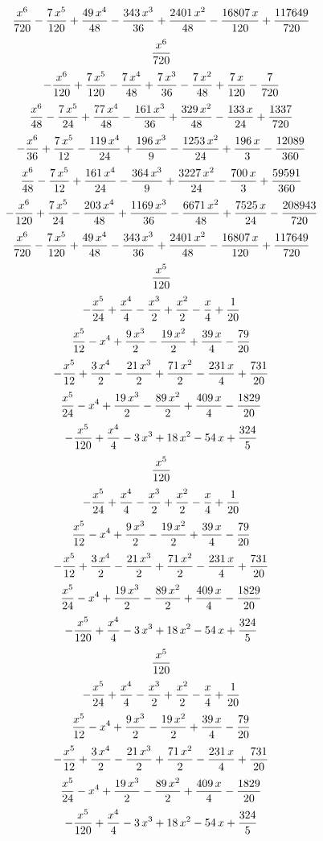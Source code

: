 $${{x^6}\over{720}}-{{7\,x^5}\over{120}}+{{49\,x^4}\over{48}}-{{343\,
 x^3}\over{36}}+{{2401\,x^2}\over{48}}-{{16807\,x}\over{120}}+{{
 117649}\over{720}}$$
$${{x^6}\over{720}}$$
$$-{{x^6}\over{120}}+{{7\,x^5}\over{120}}-{{7\,x^4}\over{48}}+{{7\,x^
 3}\over{36}}-{{7\,x^2}\over{48}}+{{7\,x}\over{120}}-{{7}\over{720}}$$
$${{x^6}\over{48}}-{{7\,x^5}\over{24}}+{{77\,x^4}\over{48}}-{{161\,x^
 3}\over{36}}+{{329\,x^2}\over{48}}-{{133\,x}\over{24}}+{{1337}\over{
 720}}$$
$$-{{x^6}\over{36}}+{{7\,x^5}\over{12}}-{{119\,x^4}\over{24}}+{{196\,
 x^3}\over{9}}-{{1253\,x^2}\over{24}}+{{196\,x}\over{3}}-{{12089
 }\over{360}}$$
$${{x^6}\over{48}}-{{7\,x^5}\over{12}}+{{161\,x^4}\over{24}}-{{364\,x
 ^3}\over{9}}+{{3227\,x^2}\over{24}}-{{700\,x}\over{3}}+{{59591
 }\over{360}}$$
$$-{{x^6}\over{120}}+{{7\,x^5}\over{24}}-{{203\,x^4}\over{48}}+{{1169
 \,x^3}\over{36}}-{{6671\,x^2}\over{48}}+{{7525\,x}\over{24}}-{{
 208943}\over{720}}$$
$${{x^6}\over{720}}-{{7\,x^5}\over{120}}+{{49\,x^4}\over{48}}-{{343\,
 x^3}\over{36}}+{{2401\,x^2}\over{48}}-{{16807\,x}\over{120}}+{{
 117649}\over{720}}$$
$${{x^5}\over{120}}$$
$$-{{x^5}\over{24}}+{{x^4}\over{4}}-{{x^3}\over{2}}+{{x^2}\over{2}}-
 {{x}\over{4}}+{{1}\over{20}}$$
$${{x^5}\over{12}}-x^4+{{9\,x^3}\over{2}}-{{19\,x^2}\over{2}}+{{39\,x
 }\over{4}}-{{79}\over{20}}$$
$$-{{x^5}\over{12}}+{{3\,x^4}\over{2}}-{{21\,x^3}\over{2}}+{{71\,x^2
 }\over{2}}-{{231\,x}\over{4}}+{{731}\over{20}}$$
$${{x^5}\over{24}}-x^4+{{19\,x^3}\over{2}}-{{89\,x^2}\over{2}}+{{409
 \,x}\over{4}}-{{1829}\over{20}}$$
$$-{{x^5}\over{120}}+{{x^4}\over{4}}-3\,x^3+18\,x^2-54\,x+{{324
 }\over{5}}$$
$${{x^5}\over{120}}$$
$$-{{x^5}\over{24}}+{{x^4}\over{4}}-{{x^3}\over{2}}+{{x^2}\over{2}}-
 {{x}\over{4}}+{{1}\over{20}}$$
$${{x^5}\over{12}}-x^4+{{9\,x^3}\over{2}}-{{19\,x^2}\over{2}}+{{39\,x
 }\over{4}}-{{79}\over{20}}$$
$$-{{x^5}\over{12}}+{{3\,x^4}\over{2}}-{{21\,x^3}\over{2}}+{{71\,x^2
 }\over{2}}-{{231\,x}\over{4}}+{{731}\over{20}}$$
$${{x^5}\over{24}}-x^4+{{19\,x^3}\over{2}}-{{89\,x^2}\over{2}}+{{409
 \,x}\over{4}}-{{1829}\over{20}}$$
$$-{{x^5}\over{120}}+{{x^4}\over{4}}-3\,x^3+18\,x^2-54\,x+{{324
 }\over{5}}$$
$${{x^5}\over{120}}$$
$$-{{x^5}\over{24}}+{{x^4}\over{4}}-{{x^3}\over{2}}+{{x^2}\over{2}}-
 {{x}\over{4}}+{{1}\over{20}}$$
$${{x^5}\over{12}}-x^4+{{9\,x^3}\over{2}}-{{19\,x^2}\over{2}}+{{39\,x
 }\over{4}}-{{79}\over{20}}$$
$$-{{x^5}\over{12}}+{{3\,x^4}\over{2}}-{{21\,x^3}\over{2}}+{{71\,x^2
 }\over{2}}-{{231\,x}\over{4}}+{{731}\over{20}}$$
$${{x^5}\over{24}}-x^4+{{19\,x^3}\over{2}}-{{89\,x^2}\over{2}}+{{409
 \,x}\over{4}}-{{1829}\over{20}}$$
$$-{{x^5}\over{120}}+{{x^4}\over{4}}-3\,x^3+18\,x^2-54\,x+{{324
 }\over{5}}$$
